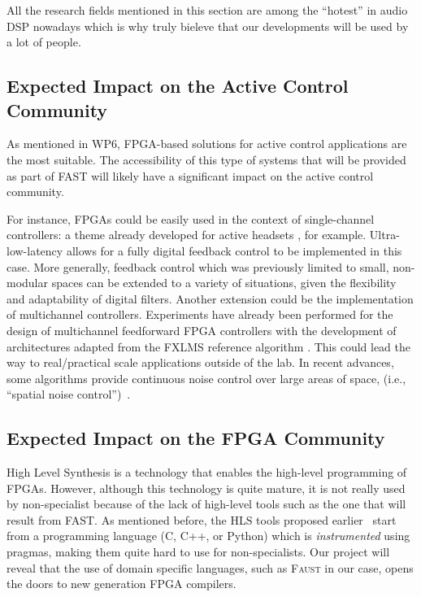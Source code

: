 \documentclass[a4paper,9pt]{extarticle}
\newcommand{\F}{\textsc{Faust}}
\newcommand{\PP}{FAST}
\newcommand{\projectname}[0]{\PP}
\begin{document}
All the research fields mentioned in this section are among the ``hotest'' in audio DSP nowadays which is why truly bieleve that our developments will be used by a lot of people.

\subsection{Expected Impact on the Active Control Community}

As mentioned in WP6, FPGA-based solutions for active control applications are the most suitable. The accessibility of this type of systems that will be provided as part of \PP{} will likely have a significant impact on the active control community. 

For instance, FPGAs could be easily used in the context of single-channel controllers: 
a theme already developed for active headsets \cite{benois2017fully}, for example. Ultra-low-latency allows for a fully digital feedback control to be implemented in this case. More generally, feedback control which was previously limited to small, non-modular spaces can be extended to a variety of situations, given the flexibility and adaptability of digital filters. 
Another extension could be the implementation of multichannel controllers. Experiments have already been performed for the design of multichannel feedforward FPGA controllers with the development of architectures adapted from the FXLMS reference algorithm \cite{shi2019practical}. This could lead the way to real/practical scale applications outside of the lab. 
In recent advances, some algorithms provide continuous noise control over large areas of space, (i.e., ``spatial noise control'')~\cite{lecomte2018cancellation,zhang2018active}.

\subsection{Expected Impact on the FPGA Community}

High Level Synthesis is a technology that enables the high-level programming of FPGAs. However, although this technology is quite mature, it is not really used by non-specialist because of the lack of high-level tools such as the one that will result from {\projectname}. As mentioned before, the HLS tools proposed earlier~\cite{pico,catapultC,gaut} start from a programming language (C, C++, or Python) which is {\em instrumented} using pragmas, making them quite hard to use for non-specialists. Our project will reveal that the use of domain specific languages, such as \F{} in our case, opens the doors to new generation FPGA compilers.
\end{document}
